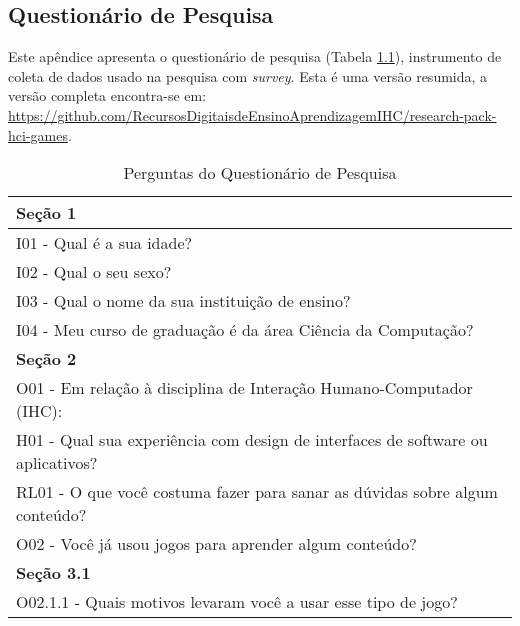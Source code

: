 \begin{apendicesenv}


\chapter{Questionário de Pesquisa}
\label{ap:questionario}

Este apêndice apresenta o questionário de pesquisa (Tabela \ref{tab:quest-survey}), instrumento de coleta de dados usado na pesquisa com \textit{survey}. Esta é uma versão resumida, a versão completa encontra-se em: \url{https://github.com/RecursosDigitaisdeEnsinoAprendizagemIHC/research-pack-hci-games}.

\begin{table} [!h]
\centering
\caption{Perguntas do Questionário de Pesquisa}
\label{tab:quest-survey}
\begin{tabular}{|p{15.45cm}|}
\hline

\textbf{Seção 1} \\ \hline

I01 - Qual é a sua idade? \\ \hline

I02 - Qual o seu sexo? \\ \hline

I03 - Qual o nome da sua instituição de ensino? \\ \hline

I04 - Meu curso de graduação é da área Ciência da Computação? \\ \hline

\textbf{Seção 2} \\ \hline

O01 - Em relação à disciplina de Interação Humano-Computador (IHC):\\ \hline

H01 - Qual sua experiência com design de interfaces de software ou aplicativos?
\\ \hline


RL01 - O que você costuma fazer para sanar as dúvidas sobre algum conteúdo?
\\ \hline

O02 - Você já usou jogos para aprender algum conteúdo?\\ \hline

\textbf{Seção 3.1  } \\ \hline

O02.1.1 - Quais motivos levaram você a usar esse tipo de jogo? \\ \hline


\end{tabular}
\end{table}
\end{apendicesenv}
